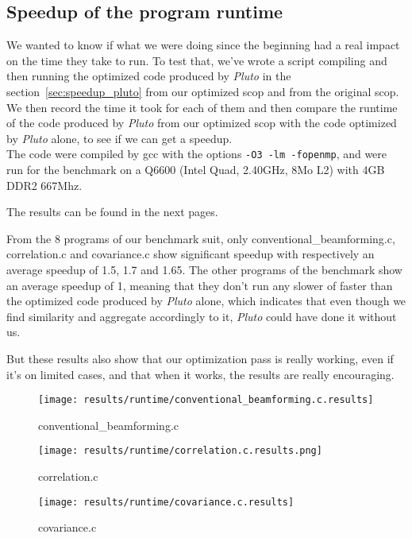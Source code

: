 \documentclass[paper=a4, fontsize=11.5pt]{scrartcl}
\numberwithin{equation}{section}        %
\numberwithin{figure}{section}          %
\numberwithin{table}{section}               %
\begin{document}
\subsection{Speedup of the program runtime}

We wanted to know if what we were doing since the beginning had a real impact on the time they
take to run. To test that, we've wrote a script compiling and then running the optimized code
produced by \textit{Pluto} in the section~\ref{sec:speedup_pluto} from our optimized scop and
from the original scop. We then record the time it took for each of them and then compare
the runtime of the code produced by \textit{Pluto} from our optimized scop with the code
optimized by \textit{Pluto} alone, to see if we can get a speedup.\\
The code were compiled by gcc with the options \verb'-O3 -lm -fopenmp', and were run for
the benchmark on a Q6600 (Intel Quad, 2.40GHz, 8Mo L2) with 4GB DDR2 667Mhz.

The results can be found in the next pages. 

\bigskip

From the 8 programs of our benchmark suit, only conventional\_beamforming.c,
correlation.c and covariance.c show significant speedup with respectively an average speedup of
1.5, 1.7 and 1.65. The other programs of the benchmark show an average speedup of 1, meaning
that they don't run any slower of faster than the optimized code produced by \textit{Pluto} alone,
which indicates that even though we find similarity and aggregate accordingly to it, \textit{Pluto}
could have done it without us.

But these results also show that our optimization pass is really working, even if
it's on limited cases, and that when it works, the results are really encouraging.

\begin{figure}[H]
    \center
    \texttt{[image: results/runtime/conventional\_beamforming.c.results]}
    \caption{conventional\_beamforming.c}\label{fig:runtime:conv_beam}
\end{figure}
\begin{figure}[H]
    \center
    \texttt{[image: results/runtime/correlation.c.results.png]}
    \caption{correlation.c}\label{fig:runtime:correlation}
    \texttt{[image: results/runtime/covariance.c.results]}
    \caption{covariance.c}\label{fig:runtime:covariance}
\end{figure}
\restoregeometry
\end{document}

